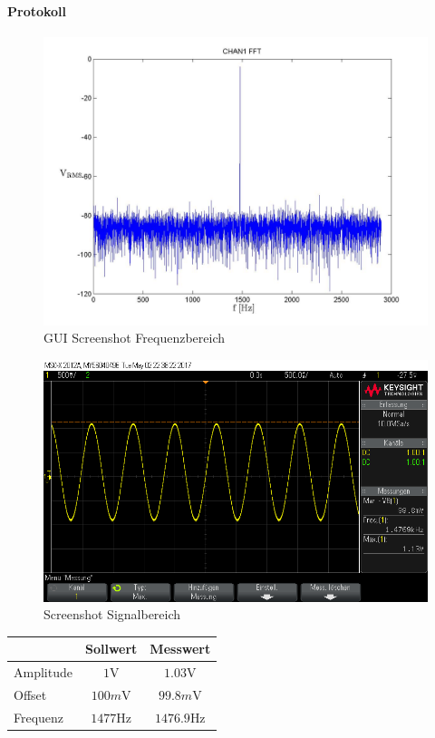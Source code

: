 \documentclass[10pt]{scrreprt}
\begin{document}
        \paragraph{Protokoll}
        \begin{center}
            \begin{figure}[H]
                \includegraphics[width=\textwidth]{Screenshot_GUI_4131_FFT_chan1_fft.jpg}
              \caption{GUI Screenshot Frequenzbereich}
            \end{figure}
            \begin{figure}[H]
                \includegraphics[width=\textwidth]{Screenshot_GUI_4131_Zeit_werte.png}
              \caption{Screenshot  Signalbereich}
            \end{figure}
            \begin{tabular}{lcc}
                \toprule
                & Sollwert & Messwert\\
                \midrule
                Amplitude & $1\si{\volt}$ & $1.03\si{\volt}$\\
                Offset & $100\si{m\volt}$ & $99.8\si{m\volt}$\\
                Frequenz & $1477\si{\hertz}$ & $1476.9\si{\hertz}$\\
                \bottomrule
            \end{tabular}
        \end{center}
\end{document}
